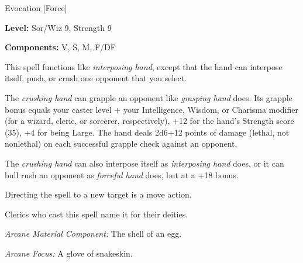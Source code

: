 
Evocation [Force]

\textbf{Level:} Sor/Wiz 9, Strength 9

\textbf{Components:} V, S, M, F/DF

This spell functions like \textit{interposing hand}, except that the hand can interpose 
itself, push, or crush one opponent that you select.

The \textit{crushing hand} can grapple an opponent like \textit{grasping hand} does. 
Its grapple bonus equals your caster level + your Intelligence, Wisdom, or Charisma 
modifier (for a wizard, cleric, or sorcerer, respectively), +12 for the hand's 
Strength score (35), +4 for being Large. The hand deals 2d6+12 points of damage 
(lethal, not nonlethal) on each successful grapple check against an opponent.

The \textit{crushing hand} can also interpose itself as \textit{interposing hand 
}does, or it can bull rush an opponent as \textit{forceful hand} does, but at a 
+18 bonus.

Directing the spell to a new target is a move action.

Clerics who cast this spell name it for their deities.

\textit{Arcane Material Component:} The shell of an egg.

\textit{Arcane Focus:} A glove of snakeskin.

